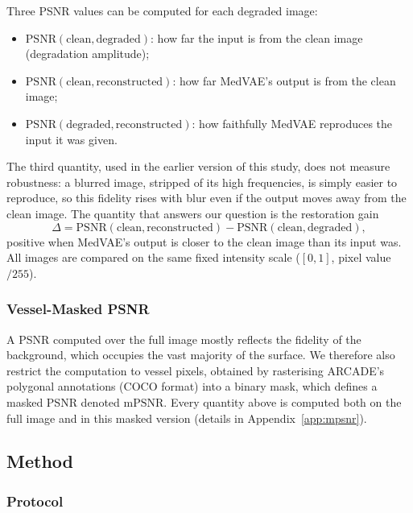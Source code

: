 \documentclass[conference]{IEEEtran}
\begin{document}
Three PSNR values can be computed for each degraded image:
\begin{itemize}
\itemsep0.2em
\item $\mathrm{PSNR}(\text{clean}, \text{degraded})$: how far the input
      is from the clean image (degradation amplitude);
\item $\mathrm{PSNR}(\text{clean}, \text{reconstructed})$: how far
      MedVAE's output is from the clean image;
\item $\mathrm{PSNR}(\text{degraded}, \text{reconstructed})$: how
      faithfully MedVAE reproduces the input it was given.
\end{itemize}
The third quantity, used in the earlier version of this study, does not
measure robustness: a blurred image, stripped of its high frequencies,
is simply easier to reproduce, so this fidelity rises with blur even if
the output moves away from the clean image. The quantity that answers
our question is the restoration gain
\begin{equation}
\Delta = \mathrm{PSNR}(\text{clean}, \text{reconstructed}) - \mathrm{PSNR}(\text{clean}, \text{degraded}),
\label{eq:delta}
\end{equation}
positive when MedVAE's output is closer to the clean image than its
input was. All images are compared on the same fixed intensity scale
($[0,1]$, pixel value$/255$).

\subsubsection{Vessel-Masked PSNR}
\label{sec:masked-psnr}

A PSNR computed over the full image mostly reflects the fidelity of the
background, which occupies the vast majority of the surface. We
therefore also restrict the computation to vessel pixels, obtained by
rasterising ARCADE's polygonal annotations (COCO format) into a binary
mask, which defines a masked PSNR denoted $\mathrm{mPSNR}$. Every
quantity above is computed both on the full image and in this masked
version (details in Appendix~\ref{app:mpsnr}).

\subsection{Method}
\label{sec:methode}

\subsubsection{Protocol}
\label{sec:protocole}
\end{document}
